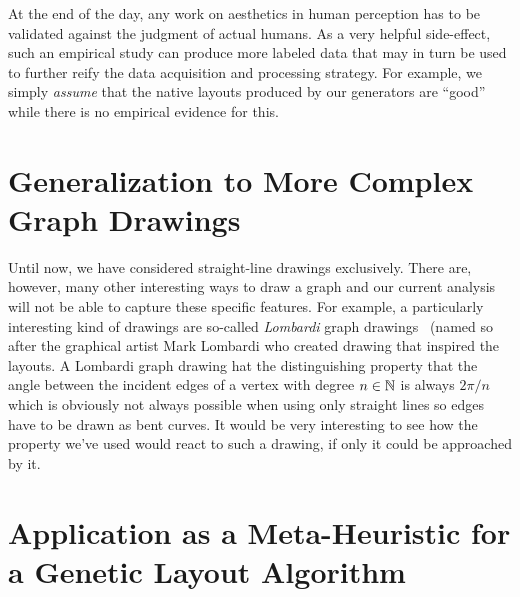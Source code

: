 \documentclass{graphstudy}
\begin{document}
At the end of the day, any work on aesthetics in human perception has to be validated against the judgment of actual
humans.  As a very helpful side-effect, such an empirical study can produce more labeled data that may in turn be used
to further reify the data acquisition and processing strategy.  For example, we simply \emph{assume} that the native
layouts produced by our generators are \enquote{good} while there is no empirical evidence for this.

\section{Generalization to More Complex Graph Drawings}

Until now, we have considered straight-line drawings exclusively.  There are, however, many other interesting ways to
draw a graph and our current analysis will not be able to capture these specific features.  For example, a particularly
interesting kind of drawings are so-called \emph{Lombardi} graph drawings~\cite{Purchase2013} (named so after the
graphical artist Mark Lombardi who created drawing that inspired the layouts.  A Lombardi graph drawing hat the
distinguishing property that the angle between the incident edges of a vertex with degree \(n\in\mathbb{N}\) is always
\(2\pi/n\) which is obviously not always possible when using only straight lines so edges have to be drawn as bent
curves.  It would be very interesting to see how the  property we've used would react to such a drawing,
if only it could be approached by it.

\section{Application as a Meta-Heuristic for a Genetic Layout Algorithm}
\end{document}
